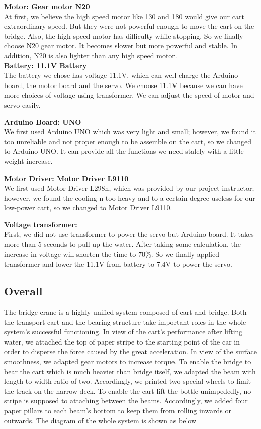 \bigskip
\noindent
\textbf{Motor: Gear motor N20 } \\
\indent
At first, we believe the high speed motor like 130 and 180 would give our cart
extraordinary speed.
But they were not powerful enough to move the cart on the bridge.
Also, the high speed motor has difficulty while stopping.
So we finally choose N20 gear motor.
It becomes slower but more powerful and stable.
In addition, N20 is also lighter than any high speed motor.  \\

\bigskip
\noindent
\textbf{Battery: 11.1V Battery } \\
\indent
The battery we chose has voltage 11.1V, which can well charge the Arduino board,
the motor board and the servo.
We choose 11.1V because we can have more choices of voltage using transformer.
We can adjust the speed of motor and servo easily.  

\bigskip
\noindent
\textbf{Arduino Board: UNO } \\
\indent
We first used Arduino UNO which was very light and small; however, we found it
too unreliable and not proper enough to be assemble on the cart, so we changed
to Arduino UNO.
It can provide all the functions we need stalely with a little weight increase.

\bigskip
\noindent
\textbf{Motor Driver: Motor Driver L9110 } \\
\indent
We first used Motor Driver L298n, which was provided by our project instructor;
however, we found the cooling n too heavy and to a certain degree useless for
our low-power cart, so we changed to Motor Driver L9110.

\bigskip
\noindent
\textbf{Voltage transformer:} \\
\indent
First, we did not use transformer to power the servo but Arduino board.
It takes more than 5 seconds to pull up the water.
After taking some calculation, the increase in voltage will shorten the time to
70\%.
So we finally applied transformer and lower the 11.1V from battery to 7.4V to
power the servo.

\subsection{Overall}

The bridge crane is a highly unified system composed of cart and bridge. Both the transport cart and the bearing structure take important roles in the whole system’s successful functioning.
In view of the cart’s performance after lifting water, we attached the top of paper stripe to the starting point of the car in order to disperse the force caused by the great acceleration. In view of the surface smoothness, we adapted gear motors to increase torque.
To enable the bridge to bear the cart which is much heavier than bridge itself, we adapted the beam with length-to-width ratio of two. Accordingly, we printed two special wheels to limit the track on the narrow deck. To enable the cart lift the bottle unimpededly, no stripe is supposed to attaching between the beams. Accordingly, we added four paper pillars to each beam’s bottom to keep them from rolling inwards or outwards. 
The diagram of the whole system is shown as below

